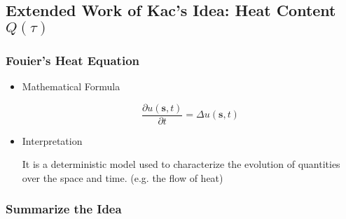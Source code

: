         



\subsection{Extended Work of Kac’s Idea: Heat Content $Q(\tau)$ \cite{vandenberg1994heat}}



  \subsubsection{Fouier's Heat Equation \cite{baron1878analytical}}

  \begin{itemize}
    \item Mathematical Formula
        \par
        \begin{equation}\label{eq:heat_equation}
          \frac{\partial u(\bm{s}, t)}{\partial t} = \Delta u(\bm{s}, t)
        \end{equation}

   \item Interpretation
     \par
     It is a deterministic model used to characterize the evolution of quantities over the space and time. (e.g. the flow of heat)
  \end{itemize}




  \subsubsection{Summarize the Idea}


